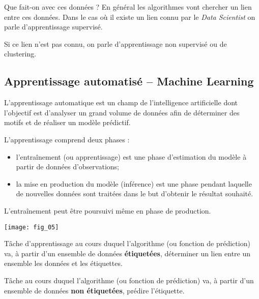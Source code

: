 Que fait-on avec ces données ? En général les algorithmes vont chercher un lien entre ces données. Dans le cas où il existe un lien connu par le \textit{Data Scientist} on parle d'apprentissage supervisé. 

Si ce lien n'est pas connu, on parle d'apprentissage non supervisé ou de clustering. 


\subsection{Apprentissage automatisé -- Machine Learning}

\begin{defi}
L'apprentissage automatique est un champ de l'intelligence artificielle dont l'objectif est d'analyser un grand volume de
données afin de déterminer des motifs et de réaliser un modèle prédictif. 

L'apprentissage comprend deux phases : 
\begin{itemize}
\item l’entraînement (ou apprentissage) est une phase d'estimation du modèle à partir de données d'observations; 
\item la mise en production du modèle (inférence) est une phase pendant laquelle de nouvelles données sont traitées dans le but d'obtenir le résultat souhaité. 
\end{itemize}

L’entraînement peut être poursuivi même en phase de production.

\end{defi}


\begin{exemple}
\begin{center}
\texttt{[image: fig\_05]}
\end{center}
\end{exemple}


\begin{defi}
Tâche d'apprentissage au cours duquel l'algorithme (ou fonction de prédiction) va, à partir d'un ensemble de données \textbf{étiquetées}, déterminer un lien entre un ensemble les données et les étiquettes. 
\end{defi}

\begin{defi}
Tâche au cours duquel l'algorithme (ou fonction de prédiction) va, à partir d'un ensemble de données \textbf{non étiquetées}, prédire l'étiquette.

\end{defi}



